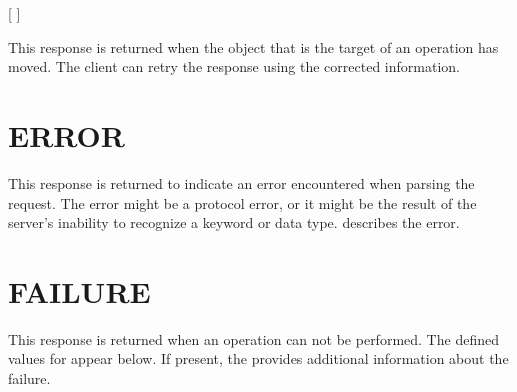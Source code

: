 \begin{command}
\commandsize
\protect{} \protect{} \protect{}
	\protect{} \protect{}
	\protect{} 	 [   ] \\
	\protect\zoms \protect{} \protect{} \protect{}\protect\zome
\end{command}

This response is returned when the object that is the target of an
operation has moved.  The client can retry the response using the
corrected information.

\section{ERROR}

\begin{command}
\commandsize
\protect{} \protect{}
\end{command}

This response is returned to indicate an error encountered when
parsing the request.  The error might be a protocol error, or it might
be the result of the server's inability to recognize a keyword or data
type.  describes the error.

\section{FAILURE}

\begin{command}
\commandsize
\protect{} \protect{}
	\zoos\protect{} \zooe
\end{command}

This response is returned when an operation can not be performed.  The
defined values for  appear below.
If present, the  provides additional information
about the failure.

